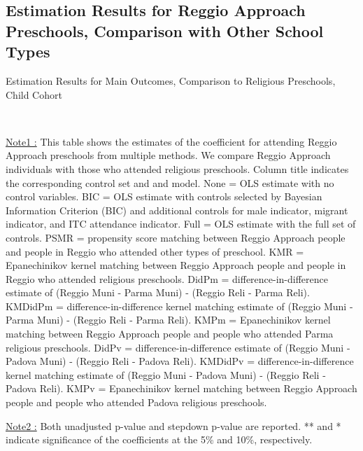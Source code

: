 \subsection{Estimation Results for Reggio Approach Preschools, Comparison with Other School Types} \label{app:comparison-reli-stat}

\begin{table}[H] \caption{Estimation Results for Main Outcomes, Comparison to Religious Preschools, Child Cohort} \label{ols-M-child-reg-reli}
\scalebox{0.59}{}
\vspace{1ex} \\
\footnotesize\raggedright{\underline{Note1 :} This table shows the estimates of the coefficient for attending Reggio Approach preschools from multiple methods. We compare Reggio Approach individuals with those who attended religious preschools. Column title indicates the corresponding control set and and model. None = OLS estimate with no control variables. BIC = OLS estimate with controls selected by Bayesian Information Criterion (BIC) and additional controls for male indicator, migrant indicator, and ITC attendance indicator. Full = OLS estimate with the full set of controls. PSMR =  propensity score matching between Reggio Approach people and people in Reggio who attended other types of preschool. KMR = Epanechinikov kernel matching between Reggio Approach people and people in Reggio who attended religious preschools. DidPm = difference-in-difference estimate of (Reggio Muni - Parma Muni) - (Reggio Reli - Parma Reli). KMDidPm = difference-in-difference kernel matching estimate of (Reggio Muni - Parma Muni) - (Reggio Reli - Parma Reli). KMPm = Epanechinikov kernel matching between Reggio Approach people and people who attended Parma religious preschools. DidPv = difference-in-difference estimate of (Reggio Muni - Padova Muni) - (Reggio Reli - Padova Reli). KMDidPv = difference-in-difference kernel matching estimate of (Reggio Muni - Padova Muni) - (Reggio Reli - Padova Reli).  KMPv = Epanechinikov kernel matching between Reggio Approach people and people who attended Padova religious preschools.}

\footnotesize\raggedright{\underline{Note2 :} Both unadjusted p-value and stepdown p-value are reported. ** and * indicate significance of the coefficients at the 5\% and 10\%, respectively.}

\end{table}


